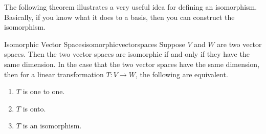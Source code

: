 The following theorem illustrates a very useful idea for defining an
isomorphism. Basically, if you know what it does to a basis, then you can
construct the isomorphism.

\begin{theorem}{Isomorphic Vector Spaces}{isomorphicvectorspaces}
Suppose $V$ and $W$ are two vector spaces. Then the two vector spaces are isomorphic if and only
if they have the same dimension. In the case that the two vector spaces have
the same dimension, then for
 a linear transformation $T:V\rightarrow W$, the
following are equivalent.

\begin{enumerate}
\item $T$ is one to one.

\item $T$ is onto.

\item $T$ is an isomorphism.
\end{enumerate}
\end{theorem}

